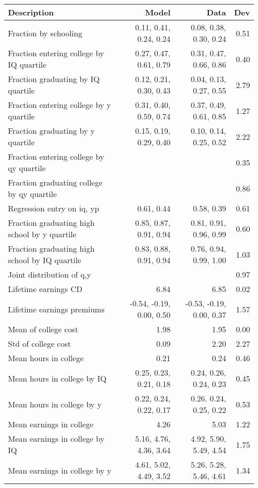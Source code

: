 \begin{tabular}{lrrr}
\hline
Description & Model  & Data  & Dev  \\ 
\hline
Fraction by schooling & 0.11, 0.41, 0.24, 0.24  & 0.08, 0.38, 0.30, 0.24  & 0.51  \\ 
Fraction entering college by IQ quartile & 0.27, 0.47, 0.61, 0.79  & 0.31, 0.47, 0.66, 0.86  & 0.40  \\ 
Fraction graduating by IQ quartile & 0.12, 0.21, 0.30, 0.43  & 0.04, 0.13, 0.27, 0.55  & 2.79  \\ 
Fraction entering college by y quartile & 0.31, 0.40, 0.59, 0.74  & 0.37, 0.49, 0.61, 0.85  & 1.27  \\ 
Fraction graduating by y quartile & 0.15, 0.19, 0.29, 0.40  & 0.10, 0.14, 0.25, 0.52  & 2.22  \\ 
Fraction entering college by qy quartile &   &   & 0.35  \\ 
Fraction graduating college by qy quartile &   &   & 0.86  \\ 
Regression entry on iq, yp & 0.61, 0.44  & 0.58, 0.39  & 0.61  \\ 
Fraction graduating high school by y quartile & 0.85, 0.87, 0.91, 0.94  & 0.81, 0.91, 0.96, 0.99  & 0.60  \\ 
Fraction graduating high school by IQ quartile & 0.83, 0.88, 0.91, 0.94  & 0.76, 0.94, 0.99, 1.00  & 1.03  \\ 
Joint distribution of q,y &   &   & 0.97  \\ 
Lifetime earnings CD & 6.84  & 6.85  & 0.02  \\ 
Lifetime earnings premiums & -0.54, -0.19, 0.00, 0.50  & -0.53, -0.19, 0.00, 0.37  & 1.57  \\ 
Mean of college cost & 1.98  & 1.95  & 0.00  \\ 
Std of college cost & 0.09  & 2.20  & 2.27  \\ 
Mean hours in college & 0.21  & 0.24  & 0.46  \\ 
Mean hours in college by IQ & 0.25, 0.23, 0.21, 0.18  & 0.24, 0.26, 0.24, 0.23  & 0.45  \\ 
Mean hours in college by y & 0.22, 0.24, 0.22, 0.17  & 0.26, 0.24, 0.25, 0.22  & 0.53  \\ 
Mean earnings in college & 4.26  & 5.03  & 1.22  \\ 
Mean earnings in college by IQ & 5.16, 4.76, 4.36, 3.64  & 4.92, 5.90, 5.49, 4.54  & 1.75  \\ 
Mean earnings in college by y & 4.61, 5.02, 4.49, 3.52  & 5.26, 5.28, 5.46, 4.61  & 1.34  \\ 

\end{tabular}
